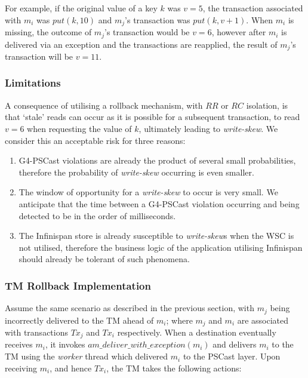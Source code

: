     For example, if the original value of a key $k$ was $v=5$, the transaction associated with $m_i$ was $put(k, 10)$ and $m_j$'s transaction was $put(k, v+1)$.  When $m_i$ is missing, the outcome of $m_j$'s transaction would be $v = 6$, however after $m_i$ is delivered via an exception and the transactions are reapplied, the result of $m_j$'s transaction will be $v = 11$.  

    \subsubsection*{Limitations}
    A consequence of utilising a rollback mechanism, with $RR$ or $RC$ isolation, is that \textquoteleft{}stale' reads can occur as it is possible for a subsequent transaction, to read $v = 6$ when requesting the value of $k$, ultimately leading to \emph{write-skew}.  We consider this an acceptable risk for three reasons: 
    \begin{enumerate}[label=\roman*]
        \item    G4-PSCast violations are already the product of several small probabilities, therefore the probability of \emph{write-skew} occurring is even smaller.  
        
        \item    The window of opportunity for a \emph{write-skew} to occur is very small.  We anticipate that the time between a G4-PSCast violation occurring and being detected to be in the order of milliseconds.   
        
        \item    The Infinispan store is already susceptible to \emph{write-skew}s when the WSC is not utilised, therefore the business logic of the application utilising Infinispan should already be tolerant of such phenomena.  
    \end{enumerate}
    
    \subsubsection*{TM Rollback Implementation}
    Assume the same scenario as described in the previous section, with $m_j$ being incorrectly delivered to the TM ahead of $m_i$; where $m_j$ and $m_i$ are associated with transactions $Tx_j$ and $Tx_i$ respectively.  When a destination eventually receives $m_i$, it invokes $am\_deliver\_with\_exception(m_i)$ and delivers $m_i$ to the TM using the \emph{worker} thread which delivered $m_i$ to the \textsf{PSCast} layer.  Upon receiving $m_i$, and hence $Tx_i$, the TM takes the following actions:
    
